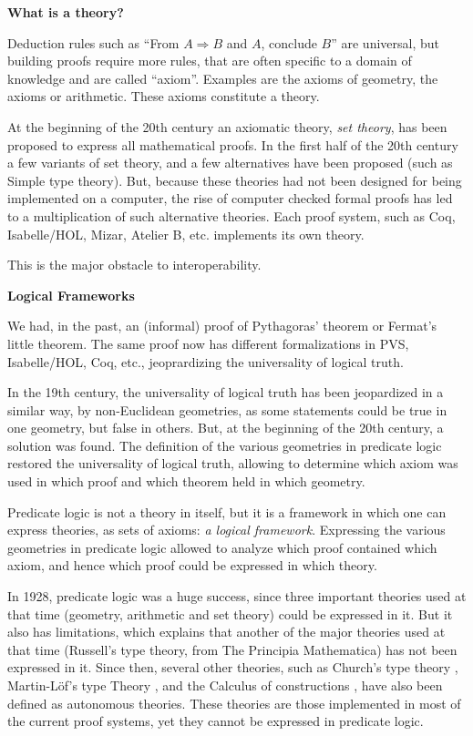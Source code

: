 \begin{framed}
\begin{center}
{\bf What is a theory?}
\end{center}

Deduction rules such as ``From $A \Rightarrow B$ and $A$, conclude
$B$'' are universal, but building proofs require more rules, that are
often specific to a domain of knowledge and are called
``axiom''. Examples are the axioms of geometry, the axioms or
arithmetic. These axioms constitute a theory.

At the beginning of the 20th century an axiomatic theory, {\em set
  theory}, has been proposed to express all mathematical proofs. In
the first half of the 20th century a few variants of set theory, and a
few alternatives have been proposed (such as Simple type theory).
But, because these theories had not been designed for being
implemented on a computer, the rise of computer checked formal proofs
has led to a multiplication of such alternative theories. Each proof system,
such as Coq, Isabelle/HOL, Mizar, Atelier B,
etc. implements its own theory.

This is the major obstacle to interoperability.
\end{framed}

\bigskip

\noindent
{\bf Logical Frameworks}

We had, in the past, an (informal) proof of Pythagoras’ theorem
or Fermat’s little theorem. The same proof now has different
formalizations in PVS, Isabelle/HOL, Coq, etc., jeoprardizing the
universality of logical truth.

In the 19th century, the universality of logical truth has been
jeopardized in a similar way, by non-Euclidean geometries, as some
statements could be true in one geometry, but false in others.  But,
at the beginning of the 20th century, a solution was found.  The
definition of the various geometries in predicate logic
\cite{HilbertAckermann} restored the universality of logical truth,
allowing to determine which axiom was used in which proof and which
theorem held in which geometry.

Predicate logic is not a theory in itself, but it is a framework in
which one can express theories, as sets of axioms: {\em a logical
  framework}.  Expressing the various geometries in predicate logic
allowed to analyze which proof contained which axiom, and hence which
proof could be expressed in which theory.

In 1928, predicate logic was a huge success, since three important
theories used at that time (geometry, arithmetic and set theory) could
be expressed in it. But it also has limitations, which explains that
another of the major theories used at that time (Russell's type
theory, from The Principia Mathematica) has not been expressed in
it. Since then, several other theories, such as Church's type theory
\cite{Church40}, Martin-L\"of's type Theory \cite{Martin-Lof84}, and
the Calculus of constructions \cite{CoquandHuet88}, have also been
defined as autonomous theories. These theories are those implemented
in most of the current proof systems, yet they cannot be expressed in
predicate logic.


